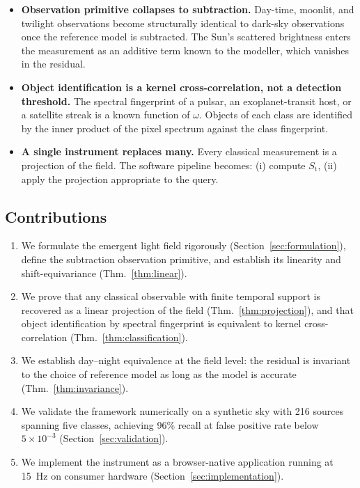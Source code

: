 \documentclass[11pt,twocolumn,a4paper]{article}
\theoremstyle{definition}
\theoremstyle{remark}
\newcommand{\Sfield}{S_{\mathrm{t}}}
\begin{document}
\begin{itemize}[nosep]
\item \textbf{Observation primitive collapses to subtraction.}
Day-time, moonlit, and twilight observations become structurally
identical to dark-sky observations once the reference model is
subtracted. The Sun's scattered brightness enters the measurement as
an additive term known to the modeller, which vanishes in the residual.
\item \textbf{Object identification is a kernel cross-correlation, not
a detection threshold.} The spectral fingerprint of a pulsar, an
exoplanet-transit host, or a satellite streak is a known function of
$\omega$. Objects of each class are identified by the inner product
of the pixel spectrum against the class fingerprint.
\item \textbf{A single instrument replaces many.} Every classical
measurement is a projection of the field. The software pipeline
becomes: (i) compute $\Sfield$, (ii) apply the projection appropriate
to the query.
\end{itemize}

\subsection{Contributions}

\begin{enumerate}[nosep]
\item We formulate the emergent light field rigorously
(Section~\ref{sec:formulation}), define the subtraction observation
primitive, and establish its linearity and shift-equivariance
(Thm.~\ref{thm:linear}).
\item We prove that any classical observable with finite temporal
support is recovered as a linear projection of the field
(Thm.~\ref{thm:projection}), and that object identification by
spectral fingerprint is equivalent to kernel cross-correlation
(Thm.~\ref{thm:classification}).
\item We establish day--night equivalence at the field level: the
residual is invariant to the choice of reference model as long as the
model is accurate (Thm.~\ref{thm:invariance}).
\item We validate the framework numerically on a synthetic sky with
216 sources spanning five classes, achieving 96\% recall at false
positive rate below $5\times 10^{-3}$
(Section~\ref{sec:validation}).
\item We implement the instrument as a browser-native application
running at 15~Hz on consumer hardware
(Section~\ref{sec:implementation}).
\end{enumerate}
\end{document}
